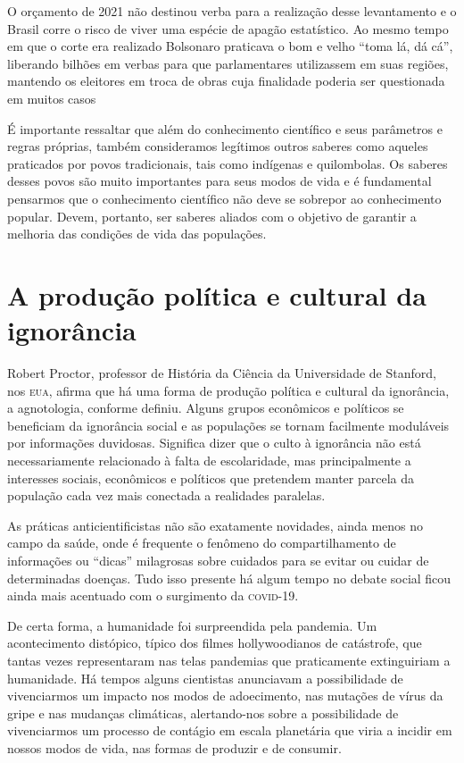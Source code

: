 O orçamento de 2021 não destinou verba para a realização desse
levantamento e o Brasil corre o risco de viver uma espécie de apagão
estatístico. Ao mesmo tempo em que o corte era realizado Bolsonaro
praticava o bom e velho ``toma lá, dá cá'', liberando bilhões em verbas
para que parlamentares utilizassem em suas regiões, mantendo os
eleitores em troca de obras cuja finalidade poderia ser questionada em
muitos casos

É importante ressaltar que além do conhecimento científico e seus
parâmetros e regras próprias, também consideramos legítimos outros
saberes como aqueles praticados por povos tradicionais, tais como
indígenas e quilombolas. Os saberes desses povos são muito importantes
para seus modos de vida e é fundamental pensarmos que o conhecimento
científico não deve se sobrepor ao conhecimento popular. Devem,
portanto, ser saberes aliados com o objetivo de garantir a melhoria das
condições de vida das populações.

\section{A produção política e cultural da ignorância}

Robert Proctor, professor de História da Ciência da Universidade de
Stanford, nos \textsc{eua}, afirma que há uma forma de produção política e
cultural da ignorância, a agnotologia, conforme definiu. Alguns grupos
econômicos e políticos se beneficiam da ignorância social e as
populações se tornam facilmente moduláveis por informações duvidosas.
Significa dizer que o culto à ignorância não está necessariamente
relacionado à falta de escolaridade, mas principalmente a interesses
sociais, econômicos e políticos que pretendem manter parcela da
população cada vez mais conectada a realidades paralelas.

As práticas anticientificistas não são exatamente novidades, ainda menos
no campo da saúde, onde é frequente o fenômeno do compartilhamento de
informações ou ``dicas'' milagrosas sobre cuidados para se evitar ou
cuidar de determinadas doenças. Tudo isso presente há algum tempo no
debate social ficou ainda mais acentuado com o surgimento da \textsc{covid-19}.

De certa forma, a humanidade foi surpreendida pela pandemia. Um
acontecimento distópico, típico dos filmes hollywoodianos de catástrofe,
que tantas vezes representaram nas telas pandemias que praticamente
extinguiriam a humanidade. Há tempos alguns cientistas anunciavam a
possibilidade de vivenciarmos um impacto nos modos de adoecimento, nas
mutações de vírus da gripe e nas mudanças climáticas, alertando-nos
sobre a possibilidade de vivenciarmos um processo de contágio em escala
planetária que viria a incidir em nossos modos de vida, nas formas de
produzir e de consumir.

